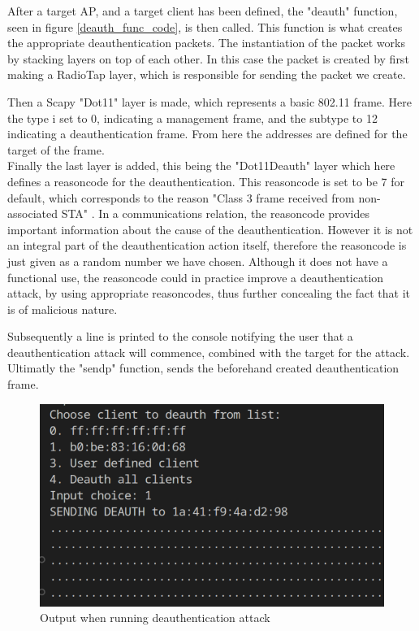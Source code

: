 After a target AP, and a target client has been defined, the "deauth" function, seen in figure \ref{deauth_func_code}, is then called. This function is what creates the appropriate deauthentication packets. The instantiation of the packet works by stacking layers on top of each other. In this case the packet is created by first making a RadioTap layer, which is responsible for sending the packet we create.

Then a Scapy "Dot11" layer is made, which represents a basic 802.11 frame. Here the type i set to 0, indicating a management frame, and the subtype to 12 indicating a deauthentication frame. From here the addresses are defined for the target of the frame. \\Finally the last layer is added, this being the "Dot11Deauth" layer which here defines a reasoncode for the deauthentication. This reasoncode is set to be 7 for default, which corresponds to the reason "Class 3 frame received from non-associated STA" \cite{Cisco_Deathentication_reasoncodes}. In a communications relation, the reasoncode provides important information about the cause of the deauthentication. However it is not an integral part of the deauthentication action itself, therefore the reasoncode is just given as a random number we have chosen.
Although it does not have a functional use, the reasoncode could in practice improve a deauthentication attack, by using appropriate reasoncodes, thus further concealing the fact that it is of malicious nature.

Subsequently a line is printed to the console notifying the user that a deauthentication attack will commence, combined with the target for the attack.
Ultimatly the "sendp" function, sends the beforehand created deauthentication frame.

\begin{figure}[!htbp]
     \centering
     \includegraphics[width=0.7
     \textwidth]{Latex-Files/Billeder/Implementation/deauth_attack.png}
     \caption{Output when running deauthentication attack}
     \label{deauth_attack}
\end{figure}

